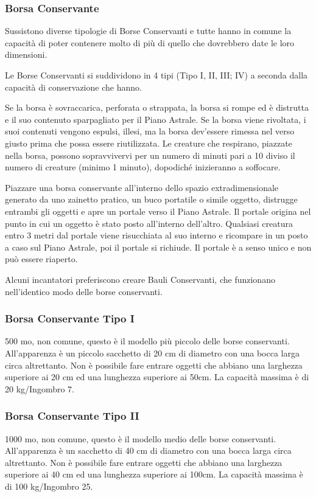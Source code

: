 \begin{multicols}{2}
\subsubsection*{Borsa Conservante}

Sussistono diverse tipologie di Borse Conservanti e tutte hanno in comune la capacità di poter contenere molto di più di quello che dovrebbero date le loro dimensioni.

Le Borse Conservanti si suddividono in 4 tipi (Tipo I, II, III; IV) a seconda dalla capacità di conservazione che hanno.

Se la borsa è sovraccarica, perforata o strappata, la borsa si rompe ed è distrutta e il suo contenuto sparpagliato per il Piano Astrale. Se la borsa viene rivoltata, i suoi contenuti vengono espulsi, illesi, ma la borsa dev'essere rimessa nel verso giusto prima che possa essere riutilizzata. Le creature che respirano, piazzate nella borsa, possono sopravvivervi per un numero di minuti pari a 10 diviso il numero di creature (minimo 1 minuto), dopodiché inizieranno a soffocare.

Piazzare una borsa conservante all'interno dello spazio extradimensionale generato da uno zainetto pratico, un buco portatile o simile oggetto, distrugge entrambi gli oggetti e apre un portale verso il Piano Astrale. Il portale origina nel punto in cui un oggetto è stato posto all'interno dell'altro. Qualsiasi creatura entro 3 metri dal portale viene risucchiata al suo interno e ricompare in un posto a caso sul Piano Astrale, poi il portale si richiude. Il portale è a senso unico e non può essere riaperto.


Alcuni incantatori preferiscono creare Bauli Conservanti, che funzionano nell'identico modo delle borse conservanti.

\subsubsection*{Borsa Conservante Tipo I}
500 mo, non comune, questo è il modello più piccolo delle borse conservanti. All'apparenza è un piccolo sacchetto di 20 cm di diametro con una bocca larga circa altrettanto.
Non è possibile fare entrare oggetti che abbiano una larghezza superiore ai 20 cm ed una lunghezza superiore ai 50cm.
La capacità massima è di 20 kg/Ingombro 7.

\subsubsection*{Borsa Conservante Tipo II}
1000 mo, non comune, questo è il modello medio delle borse conservanti. All'apparenza è un sacchetto di 40 cm di diametro con una bocca larga circa altrettanto.
Non è possibile fare entrare oggetti che abbiano una larghezza superiore ai 40 cm ed una lunghezza superiore ai 100cm.
La capacità massima è di 100 kg/Ingombro 25.


\end{multicols}
